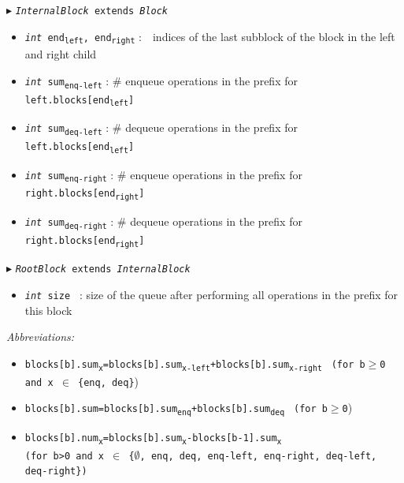 \documentclass[10pt]{article}
\newcommand{\sub}[1]{\textsubscript{#1}}
\renewcommand{\tt}[1]{\texttt{#1}}
\renewcommand{\sl}[1]{\textsl{#1}}
\renewcommand{\it}[1]{\textit{#1}}
\newcommand{\size}{size }
\theoremstyle{definition}
\begin{document}
\begin{algorithm}
\begin{algorithmic}[1]
\begin{multicols}{2}
\pagebreak

\Statex $\blacktriangleright$ \tt{\sl{InternalBlock} extends \sl{Block}}
\begin{itemize}
    \item \tt{\sl{int} end\sub{left}, end\sub{right}}
  \textsf{:~~indices of the last subblock of the block in the left and right child}
  \item \tt{\sl{int} sum\sub{enq-left}}
  \textsf{: \# enqueue operations in the prefix for \tt{left.blocks[end\sub{left}]}}
  \item \tt{\sl{int} sum\sub{deq-left}}
  \textsf{: \# dequeue operations in the prefix for \tt{left.blocks[end\sub{left}]}}
  \item \tt{\sl{int} sum\sub{enq-right}}
  \textsf{: \# enqueue operations in the prefix for \tt{right.blocks[end\sub{right}]}}
  \item \tt{\sl{int} sum\sub{deq-right}}
  \textsf{: \# dequeue operations in the prefix for \tt{right.blocks[end\sub{right}]}}
\end{itemize}


\Statex $\blacktriangleright$ \tt{\sl{RootBlock} extends \sl{InternalBlock}}
\begin{itemize}
  \item \tt{\sl{int} \size}
  \textsf{: size of the queue after performing all operations in the prefix for this block}
\end{itemize}

\end{multicols}
\end{algorithmic}
\end{algorithm}

\begin{footnotesize}

\it{Abbreviations:}
\begin{itemize}
 \item \tt{blocks[b].sum\sub{x}=blocks[b].sum\sub{x-left}+blocks[b].sum\sub{x-right}}  \tt{ (for b$\geq$0 and x $\in$ \{enq, deq\}})
 \item \tt{blocks[b].sum=blocks[b].sum\sub{enq}+blocks[b].sum\sub{deq}}  \tt{ (for b$\geq$0})
  \item \tt{blocks[b].num\sub{x}=blocks[b].sum\sub{x}-blocks[b-1].sum\sub{x}} \\ \tt{(for b>0 and x $\in$ \{$\emptyset$, enq, deq, enq-left, enq-right, deq-left, deq-right\})}
\end{itemize}
\end{footnotesize}
\end{document}
